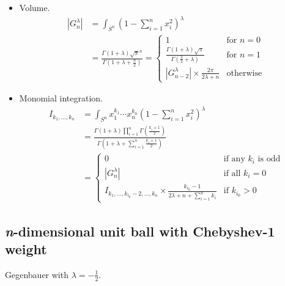 \documentclass[draft]{scrartcl}
\begin{document}
\begin{itemize}
  \item Volume.
    \begin{align}\nonumber
    |G_n^{\lambda}|
      &= \int_{S^n} \left(1 - \sum_{i=1}^n x_i^2\right)^\lambda\\
      &= \frac{
        \Gamma(1+\lambda)\sqrt{\pi}^n
      }{
        \Gamma\left(1+\lambda + \frac{n}{2}\right)
      }
      = \begin{cases}
        1&\text{for $n=0$}\\
        \frac{\Gamma(1+\lambda)\sqrt{\pi}}{\Gamma\left(\frac{3}{2} + \lambda\right)}&\text{for $n=1$}\\
        |G_{n-2}^{\lambda}|\times \frac{2\pi}{2\lambda + n}&\text{otherwise}
      \end{cases}
  \end{align}

  \item Monomial integration.
  \begin{align}\nonumber
    I_{k_1,\dots,k_n}
      &= \int_{S^n} x_1^{k_1}\cdots x_n^{k_n} \left(1 - \sum_{i=1}^n
      x_i^2\right)^\lambda\\
      &= \frac{
        \Gamma(1+\lambda)\prod_{i=1}^n \Gamma\left(\frac{k_i+1}{2}\right)
      }{
        \Gamma\left(1+\lambda + \sum_{i=1}^n \frac{k_i+1}{2}\right)
      }\\
      &= \begin{cases}
        0&\text{if any $k_i$ is odd}\\
        |G_n^{\lambda}|&\text{if all $k_i=0$}\\
        I_{k_1,\dots,k_{i_0}-2,\dots,k_n} \times \frac{k_{i_0}-1}{2\lambda + n + \sum_{i=1}^n k_i}&\text{if $k_{i_0} > 0$}
      \end{cases}
  \end{align}
\end{itemize}


\subsection*{\textit{n}-dimensional unit ball with Chebyshev-1 weight}

Gegenbauer with $\lambda=-\frac{1}{2}.$
\end{document}
